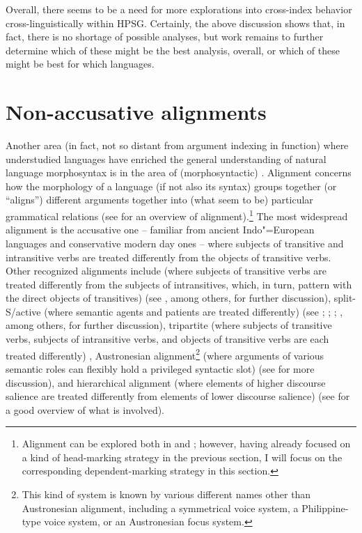 \documentclass[output=paper
	        ,collection
	        ,collectionchapter
 	        ,biblatex
                ,babelshorthands
                ,newtxmath
                ,draftmode
                ,colorlinks, citecolor=brown
]{langscibook}
\begin{document}
Overall, there seems to be a need for more explorations into cross-index behavior cross-linguistically within HPSG. Certainly, the above discussion shows that, in fact, there is no shortage of possible analyses, but work remains to further determine which of these might be the best analysis, overall, or which of these might be best for which languages.

\section{Non-accusative alignments}

Another area (in fact, not so distant from argument indexing in function) where understudied languages have enriched the general understanding of natural language morphosyntax is in the area of (morphosyntactic) . Alignment concerns how the morphology of a language (if not also its syntax) groups together (or ``aligns'') different arguments together into (what seem to be) particular grammatical relations (see \citealt{bicknich09} for an overview of alignment).\footnote{Alignment can be explored both in  and  \citep{Nichols86a-u}; however, having already focused on a kind of head-marking strategy in the previous section, I will focus on the corresponding dependent-marking strategy in this section.} The most widespread alignment is the accusative one -- familiar from ancient Indo"=European languages and conservative modern day ones -- where subjects of transitive and intransitive verbs are treated differently from the objects of transitive verbs. Other recognized alignments include  (where subjects of transitive verbs are treated differently from the subjects of intransitives, which, in turn, pattern with the direct objects of transitives) (see \citealt{comrie78erg,plank79,dixon79,dixon94}, among others, for further discussion), split-S/active (where semantic agents and patients are treated differently) (see \citealt{klimov73,klimov74}; \citealt[Chapter 4]{dixon94}; \citealt{mithun91}; \citealt{wichdon08}, among others, for further discussion), tripartite (where subjects of transitive verbs, subjects of intransitive verbs, and objects of transitive verbs are each treated differently) \citep[39--40]{dixon94}, Austronesian alignment\footnote{This kind of system is known by various different names other than Austronesian alignment, including a symmetrical voice system, a Philippine-type voice system, or an Austronesian focus system.} (where arguments of various semantic roles can flexibly hold a privileged syntactic slot) (see \citealt{schachter76,ross02,himmelmann05typchar} for more discussion), and hierarchical alignment (where elements of higher discourse salience are treated differently from elements of lower discourse salience) (see \citealt{jacqant14} for a good overview of what is involved).    
\end{document}
